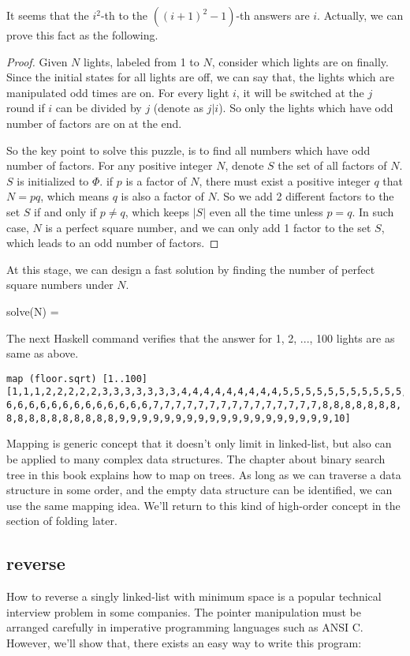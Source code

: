 \documentclass{article}
\begin{document}
It seems that the $i^2$-th to the $((i+1)^2-1)$-th answers are $i$. Actually, we can prove this fact as the following.

\begin{proof}
Given $N$ lights, labeled from 1 to $N$, consider which lights are on finally. Since the initial states for all lights
are off, we can say that, the lights which are manipulated odd times are on. For every light $i$, it will be switched
at the $j$ round if $i$ can be divided by $j$ (denote as $j | i$). So only the lights which have odd number of factors are on at the end.

So the key point to solve this puzzle, is to find all numbers which have odd number of factors. For any positive integer
$N$, denote $S$ the set of all factors of $N$. $S$ is initialized to $\Phi$. if $p$ is a factor of $N$, there must
exist a positive integer $q$ that $N = p q$, which means $q$ is also a factor of $N$. So we add 2 different factors to 
the set $S$ if and only if $p \neq q$, which keeps $|S|$ even all the time unless $p = q$. In such case, $N$ is a
perfect square number, and we can only add 1 factor to the set $S$, which leads to an odd number of factors.
\end{proof}


At this stage, we can design a fast solution by finding the number of perfect square numbers under $N$.

\be
solve(N) = \lfloor {} \rfloor
\ee

The next Haskell command verifies that the answer for 1, 2, ..., 100 lights are as same as above.

\begin{lstlisting}
map (floor.sqrt) [1..100]
[1,1,1,2,2,2,2,2,3,3,3,3,3,3,3,4,4,4,4,4,4,4,4,4,5,5,5,5,5,5,5,5,5,5,5,
6,6,6,6,6,6,6,6,6,6,6,6,6,7,7,7,7,7,7,7,7,7,7,7,7,7,7,7,8,8,8,8,8,8,8,
8,8,8,8,8,8,8,8,8,8,9,9,9,9,9,9,9,9,9,9,9,9,9,9,9,9,9,9,9,10]
\end{lstlisting}

Mapping is generic concept that it doesn't only limit in linked-list, but also can be applied to many
complex data structures. The chapter about binary search tree in this book explains how to map on trees.
As long as we can traverse a data structure in some order, and the empty data structure can be identified,
we can use the same mapping idea. We'll return to this kind of high-order concept in the section of folding 
later.

\subsection{reverse}
How to reverse a singly linked-list with minimum space is a popular technical interview problem in some companies.
The pointer manipulation must be arranged carefully in imperative programming languages such as ANSI C. 
However, we'll show that, there exists an easy way to write this program:
\end{document}
